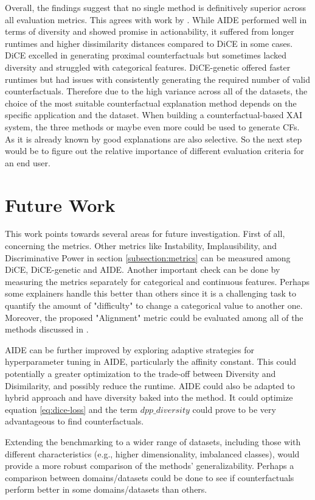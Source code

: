 Overall, the findings suggest that no single method is definitively superior across all evaluation metrics. This agrees with work by \citet{guidotti2024counterfactual}. While AIDE performed well in terms of diversity and showed promise in actionability, it suffered from longer runtimes and higher dissimilarity distances compared to DiCE in some cases. DiCE excelled in generating proximal counterfactuals but sometimes lacked diversity and struggled with categorical features. DiCE-genetic offered faster runtimes but had issues with consistently generating the required number of valid counterfactuals. Therefore due to the high variance across all of the datasets, the choice of the most suitable counterfactual explanation method depends on the specific application and the dataset. When building a counterfactual-based XAI system, the three methods or maybe even more could be used to generate CFs. As it is already known by \citet{miller2019explanation} good explanations are also selective. So the next step would be to figure out the relative importance of different evaluation criteria for an end user.

\section{Future Work}
This work points towards several areas for future investigation. First of all, concerning the metrics. Other metrics like Instability, Implausibility, and Discriminative Power in section \ref{subsection:metrics} can be measured among DiCE, DiCE-genetic and AIDE. Another important check can be done by measuring the metrics separately for categorical and continuous features. Perhaps some explainers handle this better than others since it is a challenging task to quantify the amount of "difficulty" to change a categorical value to another one. Moreover, the proposed "Alignment" metric could be evaluated among all of the methods discussed in \citet{guidotti2024counterfactual}.

AIDE can be further improved by exploring adaptive strategies for hyperparameter tuning in AIDE, particularly the affinity constant. This could potentially a greater optimization to the trade-off between Diversity and Disimilarity, and possibly reduce the runtime. AIDE could also be adapted to hybrid approach and have diversity baked into the method. It could optimize equation \ref{eq:dice-loss} and the term $dpp\_diversity$ could prove to be very advantageous to find counterfactuals.

Extending the benchmarking to a wider range of datasets, including those with different characteristics (e.g., higher dimensionality, imbalanced classes), would provide a more robust comparison of the methods' generalizability. Perhaps a comparison between domains/datasets could be done to see if counterfactuals perform better in some domains/datasets than others.

